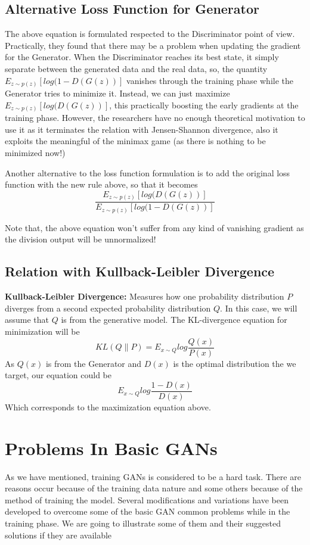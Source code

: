 \documentclass{winnower}
\begin{document}
\subsection{Alternative Loss Function for Generator}
The above equation is formulated respected to the Discriminator point of view. Practically, they found that there may be a problem when updating the gradient for the Generator. When the Discriminator reaches its best state, it simply separate between the generated data and the real data, so, the quantity \(E_{z\sim p(z)} [log(1 - D(G(z))]\) vanishes through the training phase while the Generator tries to minimize it. Instead, we can just maximize \(E_{z\sim p(z)} [log(D(G(z))]\), this practically boosting the early gradients at the training phase. However, the researchers have no enough theoretical motivation to use it as it terminates the relation with Jensen-Shannon divergence, also it exploits the meaningful of the minimax game (as there is nothing to be minimized now!)\newline

Another alternative to the loss function formulation is to add the original loss function with the new rule above, so that it becomes \[\frac{E_{z\sim p(z)} [log(D(G(z))]}{E_{z\sim p(z)} [log(1 - D(G(z))]}\]

Note that, the above equation won't suffer from any kind of vanishing gradient as the division output will be unnormalized!

\subsection{Relation with Kullback-Leibler Divergence}

\textbf{Kullback-Leibler Divergence:} Measures how one probability distribution \(P\) diverges from a second expected probability distribution \(Q\). In this case, we will assume that \(Q\) is from the generative model. The KL-divergence equation for minimization will be \[KL(Q\|P) = E_{x \sim Q} log \frac{Q(x)}{P(x)}\]
As \(Q(x)\) is from the Generator and \(D(x)\) is the optimal distribution the we target, our equation could be \[E_{x \sim Q} log \frac{1 - D(x)}{D(x)}\] Which corresponds to the maximization equation above.

\section{Problems In Basic GANs}
As we have mentioned, training GANs is considered to be a hard task. There are reasons occur because of the training data nature and some others because of the method of training the model. Several modifications and variations have been developed to overcome some of the basic GAN common problems while in the training phase. We are going to illustrate some of them and their suggested solutions if they are available
\end{document}
